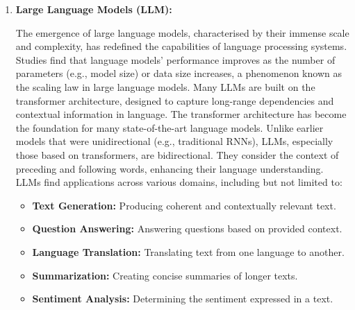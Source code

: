 \begin{enumerate}
{		      ELMo~\footnote{Embeddings from Language Models}~\cite{peters2018deep} was one of the first PLMs which used a bidirectional LSTM to generate word embeddings instead of learning fixed word representations.
		      \textcite{devlin2019bert} introduced BERT (Bidirectional Encoder Representations from Transformers), a transformer-based model pre-trained on a large corpus of text and then fine-tuned it on specific tasks.
		      BERT was a significant advancement in natural language processing, as it demonstrated the potential of pre-trained language models to achieve state-of-the-art performance on a wide range of tasks.
		      These studies introduced the \textit{"pre-training and fine-tuning"} paradigm, which has become a standard practice in the development of language models and inspired a significant number of models, such as GPT-2~\cite{radford2019language}), GPT-3 (\textcite{brown2020language}), T5 (\textcite{raffel2023exploring}, and many others.
	      }
	\item \textbf{Large Language Models (LLM):} {The emergence of large language models, characterised by their immense scale and complexity, has redefined the capabilities of language processing systems.
		      Studies find that language models' performance improves as the number of parameters (e.g., model size) or data size increases, a phenomenon known as the scaling law in large language models.
		      Many LLMs are built on the transformer architecture, designed to capture long-range dependencies and contextual information in language.
		      The transformer architecture has become the foundation for many state-of-the-art language models. Unlike earlier models that were unidirectional (e.g., traditional RNNs), LLMs, especially those based on transformers, are bidirectional. They consider the context of preceding and following words, enhancing their language understanding.
		      LLMs find applications across various domains, including but not limited to:
		      \begin{itemize}
			      \item \textbf{Text Generation:} Producing coherent and contextually relevant text.
			      \item \textbf{Question Answering:} Answering questions based on provided context.
			      \item \textbf{Language Translation:} Translating text from one language to another.
			      \item \textbf{Summarization:} Creating concise summaries of longer texts.
			      \item \textbf{Sentiment Analysis:} Determining the sentiment expressed in a text.

\end{itemize}}
\end{enumerate}
